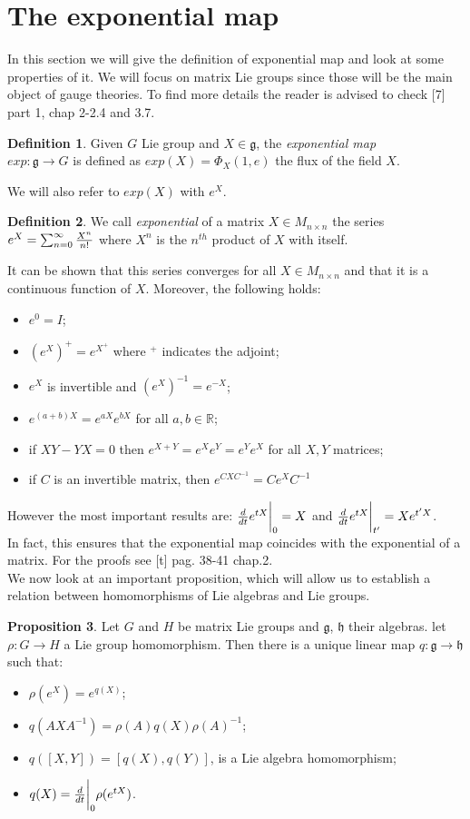 \documentclass[12pt,a4paper]{report}
\theoremstyle{definition}
\newtheorem{Def}{Definition}[chapter]
\theoremstyle{Theorem}
\newtheorem{Prop}[Def]{Proposition}
\theoremstyle{definition}
\theoremstyle{definition}
\begin{document}
	\section{The exponential map}
	In this section we will give the definition of exponential map and look at some properties of it. We will focus on matrix Lie groups since those will be the main object of gauge theories.
	To find more details the reader is advised to check [7] part 1, chap 2-2.4 and 3.7.
	\begin{Def}
		Given $G$ Lie group and $X\in\mathfrak{g}$, the \textit{exponential map} \\$exp:\mathfrak{g}\rightarrow G$ is defined as $exp(X)=\Phi_X(1,e)$ the flux of the field $X$.
	\end{Def}
	We will also refer to $exp(X)$ with $e^X$.
	\begin{Def}
		We call \textit{exponential} of a matrix $X\in M_{n\times n}$ the series \\$e^X=\sum_{n=0}^{\infty}{X^n\over n! }$ where $X^n$ is the $n^{th}$ product of $X$ with itself.
	\end{Def}
	It can be shown that this series converges for all $X\in M_{n\times n}$ and that it is a continuous function of $X$. Moreover, the following holds:
	\begin{itemize}
		\item $e^0=I$;
		\item $(e^X)^+=e^{X^+}$ where $^+$ indicates the adjoint;
		\item $e^X$ is invertible and $(e^X)^{-1}=e^{-X}$;
		\item $e^{(a+b)X}=e^{aX}e^{bX}$ for all $a,b\in\mathbb{R}$;
		\item if $XY-YX=0$ then $e^{X+Y}=e^Xe^Y=e^Ye^X$ for all $X,Y$ matrices;\\
		\item if $C$ is an invertible matrix, then $e^{CXC^{-1}}=Ce^XC^{-1}$
	\end{itemize} 
	However the most important results are: ${d\over dt}e^{tX}\bigg{\rvert}_0=X$ and ${d\over dt}e^{tX}\bigg{\rvert}_{t'}=Xe^{t'X}$.\\
	In fact, this ensures that the exponential map coincides with the exponential of a matrix. For the proofs see [t] pag. 38-41 chap.2.\\
	We now look at an important proposition, which will allow us to establish a relation between homomorphisms of Lie algebras and Lie groups.
	\begin{Prop} \label{Prop: 2.4.1}
		Let $G$ and $H$ be matrix Lie groups and $\mathfrak{g}$, $\mathfrak{h}$ their algebras. let $\rho:G\rightarrow H$ a Lie group homomorphism. Then there is a unique linear map $q:\mathfrak{g}\rightarrow\mathfrak{h}$ such that:
		\begin{itemize}
			\item $\rho(e^X)=e^{q(X)}$; 
			\item $q(AXA^{-1})=\rho(A)q(X)\rho(A)^{-1}$;
			\item $q([X,Y])=[q(X),q(Y)]$, is a Lie algebra homomorphism;
			\item $q(X)={d\over dt}\bigg{\rvert}_0\rho(e^{tX})$.
		\end{itemize}
	\end{Prop}
\end{document}
